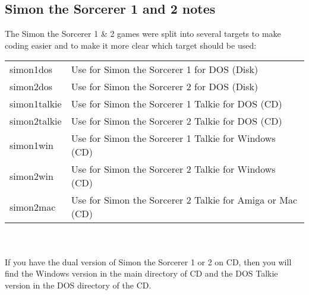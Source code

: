 \subsection{Simon the Sorcerer 1 and 2 notes}
The Simon the Sorcerer 1 \& 2 games were split into several targets to make
coding easier and to make it more clear which target should be used:\\
\begin{tabular}{ll}
       simon1dos    & Use for Simon the Sorcerer 1 for DOS (Disk)\\
       simon2dos    & Use for Simon the Sorcerer 2 for DOS (Disk)\\
       simon1talkie & Use for Simon the Sorcerer 1 Talkie for DOS (CD)\\
       simon2talkie & Use for Simon the Sorcerer 2 Talkie for DOS (CD)\\
       simon1win    & Use for Simon the Sorcerer 1 Talkie for Windows (CD)\\
       simon2win    & Use for Simon the Sorcerer 2 Talkie for Windows (CD)\\
       simon2mac    & Use for Simon the Sorcerer 2 Talkie for Amiga or Mac (CD)\\
\end{tabular}\\
\quad \\
If you have the dual version of Simon the Sorcerer 1 or 2 on CD,
then you will find the Windows version in the main directory of CD
and the DOS Talkie version in the DOS directory of the CD.\\